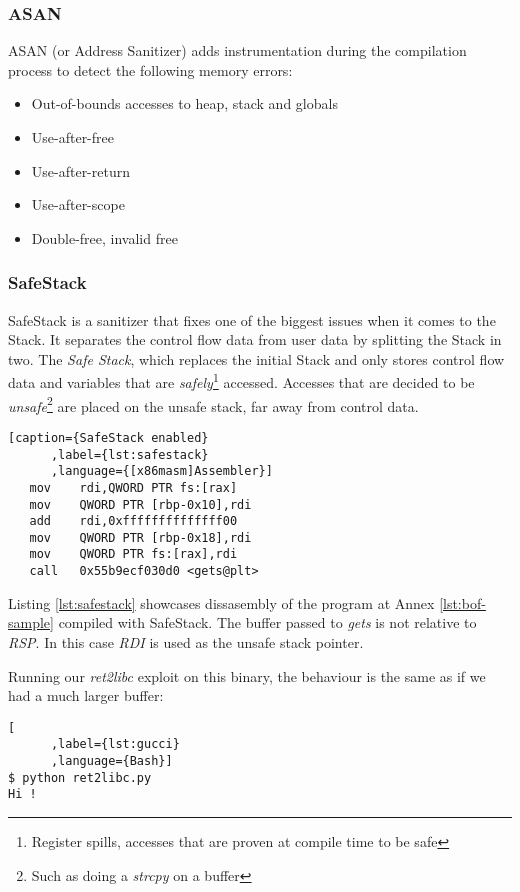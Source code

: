 \documentclass{article}
\begin{document}
\subsubsection{ASAN}
ASAN (or Address Sanitizer) adds instrumentation during the compilation process to detect the following memory errors:

\begin{itemize}
  \item Out-of-bounds accesses to heap, stack and globals
  \item Use-after-free
  \item Use-after-return
  \item Use-after-scope
  \item Double-free, invalid free
\end{itemize}

\subsubsection{SafeStack}
SafeStack is a sanitizer that fixes one of the biggest issues when it comes to the Stack. It separates the control flow data from user data by splitting the Stack in two. The \emph{Safe Stack}, which replaces the initial Stack and only stores control flow data and variables that are \emph{safely}\footnote{Register spills, accesses that are proven at compile time to be safe} accessed. Accesses that are decided to be \emph{unsafe}\footnote{Such as doing a \emph{strcpy} on a buffer} are placed on the unsafe stack, far away from control data.

\begin{lstlisting}[caption={SafeStack enabled}
      ,label={lst:safestack}
      ,language={[x86masm]Assembler}]
   mov    rdi,QWORD PTR fs:[rax]
   mov    QWORD PTR [rbp-0x10],rdi
   add    rdi,0xffffffffffffff00
   mov    QWORD PTR [rbp-0x18],rdi
   mov    QWORD PTR fs:[rax],rdi
   call   0x55b9ecf030d0 <gets@plt>
\end{lstlisting}

Listing \ref{lst:safestack} showcases dissasembly of the program at Annex \ref{lst:bof-sample} compiled with SafeStack. The buffer passed to \emph{gets} is not relative to \emph{RSP}. In this case \emph{RDI} is used as the unsafe stack pointer.

Running our \emph{ret2libc} exploit on this binary, the behaviour is the same as if we had a much larger buffer:
\begin{lstlisting}[
      ,label={lst:gucci}
      ,language={Bash}]
$ python ret2libc.py
Hi !
\end{lstlisting}
\end{document}
